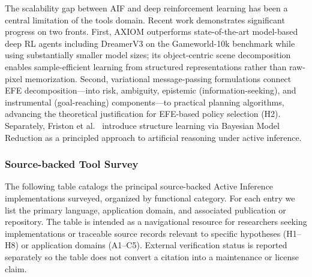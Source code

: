 \documentclass[
  english,
]{article}
\begin{document}
The scalability gap between AIF and deep reinforcement learning has been
a central limitation of the tools domain. Recent work demonstrates
significant progress on two fronts. First, AXIOM \citep{heins2025axiom}
outperforms state-of-the-art model-based deep RL agents including
DreamerV3 on the Gameworld-10k benchmark while using substantially
smaller model sizes; its object-centric scene decomposition enables
sample-efficient learning from structured representations rather than
raw-pixel memorization. Second, variational message-passing formulations
\citep{champion2021realizing} connect EFE decomposition---into risk,
ambiguity, epistemic (information-seeking), and instrumental
(goal-reaching) components---to practical planning algorithms, advancing
the theoretical justification for EFE-based policy selection (H2).
Separately, Friston et al.~\citep{friston2025active} introduce structure
learning via Bayesian Model Reduction as a principled approach to
artificial reasoning under active inference.

\FloatBarrier

\subsubsection{Source-backed Tool
Survey}\label{source-backed-tool-survey}

The following table catalogs the principal source-backed Active
Inference implementations surveyed, organized by functional category.
For each entry we list the primary language, application domain, and
associated publication or repository. The table is intended as a
navigational resource for researchers seeking implementations or
traceable source records relevant to specific hypotheses (H1--H8) or
application domains (A1--C5). External verification status is reported
separately so the table does not convert a citation into a maintenance
or license claim.
\end{document}
